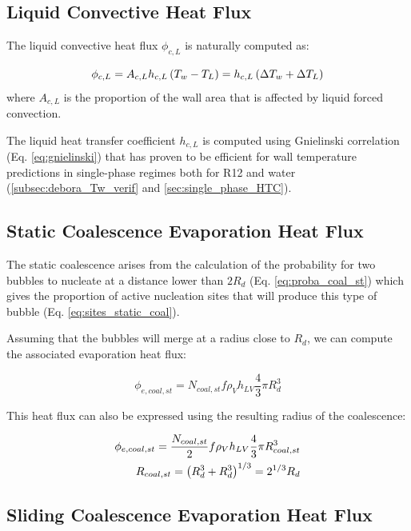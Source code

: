 \subsection{Liquid Convective Heat Flux}

The liquid convective heat flux $\phi_{c,L}$ is naturally computed as:

\begin{equation}
\phi_{c,L} = A_{c,L}h_{c,L}\left( T_{w}-T_{L} \right) = h_{c,L}\left( \Delta T_{w} + \Delta T_{L} \right)
\end{equation}
where $A_{c,L}$ is the proportion of the wall area that is affected by liquid forced convection.

\npar

The liquid heat transfer coefficient $h_{c,L}$ is computed using Gnielinski correlation (Eq. \ref{eq:gnielinski}) that has proven to be efficient for wall temperature predictions in single-phase regimes both for R12 and water (\ref{subsec:debora_Tw_verif} and \ref{sec:single_phase_HTC}). 

\subsection{Static Coalescence Evaporation Heat Flux}

The static coalescence arises from the calculation of the probability for two bubbles to nucleate at a distance lower than $2R_{d}$ (Eq. \ref{eq:proba_coal_st}) which gives the proportion of active nucleation sites that will produce this type of bubble (Eq. \ref{eq:sites_static_coal}). 

\npar

Assuming that the bubbles will merge at a radius close to $R_{d}$, we can compute the associated evaporation heat flux:

\begin{equation}
\phi_{e,coal,st} = N_{coal,st} f \rho_{V} h_{LV} \frac{4}{3}\pi R_{d}^{3}
\end{equation}

This heat flux can also be expressed using the resulting radius of the coalescence:

\begin{align}
\phi_{e,coal,st} = \frac{N_{coal,st}}{2} f \rho_{V} h_{LV} \frac{4}{3}\pi R_{coal,st}^{3}\\
R_{coal,st} = \left( R_{d}^{3}+R_{d}^{3} \right)^{1/3} = 2^{1/3}R_{d}
\end{align}

\subsection{Sliding Coalescence Evaporation Heat Flux}

